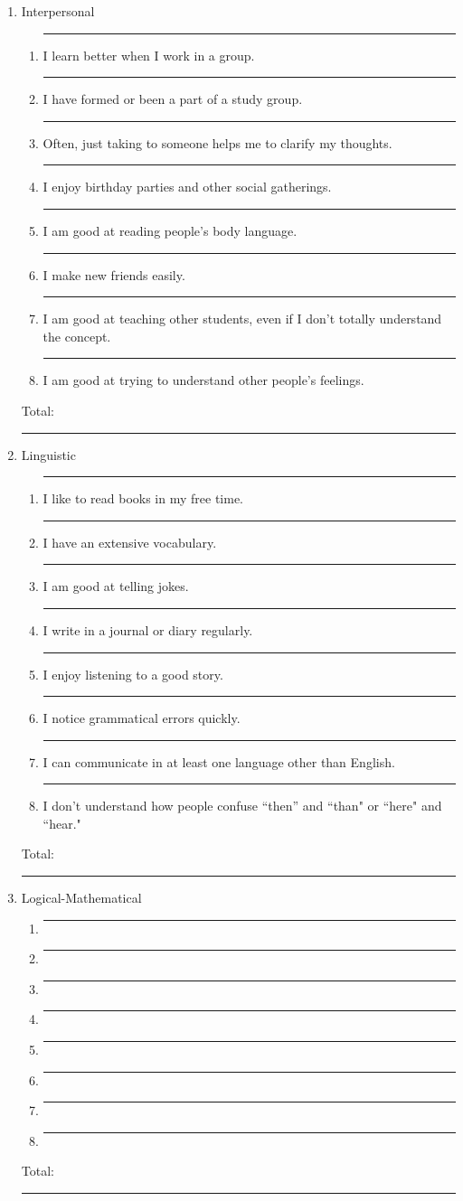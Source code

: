 \documentclass[letterpaper, 11pt]{article}
\begin{document}
\begin{enumerate}
\item Interpersonal
	\begin{enumerate}
	\item \rule{.5in}{.01in} I learn better when I work in a group.
	\item \rule{.5in}{.01in} I have formed or been a part of a study group.
	\item \rule{.5in}{.01in} Often, just taking to someone helps me to clarify my thoughts.
	\item \rule{.5in}{.01in} I enjoy birthday parties and other social gatherings.
	\item \rule{.5in}{.01in} I am good at reading people's body language.
	\item \rule{.5in}{.01in} I make new friends easily.
	\item \rule{.5in}{.01in} I am good at teaching other students, even if I don't totally understand the concept.
	\item \rule{.5in}{.01in} I am good at trying to understand other people's feelings.
\end{enumerate}
Total:  \rule{.5in}{.01in}


\item Linguistic
	\begin{enumerate}
	\item \rule{.5in}{.01in} I like to read books in my free time.
	\item \rule{.5in}{.01in} I have an extensive vocabulary.
	\item \rule{.5in}{.01in} I am good at telling jokes.
	\item \rule{.5in}{.01in} I write in a journal or diary regularly. 
	\item \rule{.5in}{.01in} I enjoy listening to a good story.
	\item \rule{.5in}{.01in} I notice grammatical errors quickly.  
	\item \rule{.5in}{.01in} I can communicate in at least one language other than English.
	\item \rule{.5in}{.01in} I don't understand how people confuse ``then'' and ``than" or ``here" and ``hear."
	
\end{enumerate}
Total:  \rule{.5in}{.01in}

\item Logical-Mathematical
	\begin{enumerate}
	\item \rule{.5in}{.01in} 
	\item \rule{.5in}{.01in} 
	\item \rule{.5in}{.01in} 
	\item \rule{.5in}{.01in} 
	\item \rule{.5in}{.01in} 
	\item \rule{.5in}{.01in} 
	\item \rule{.5in}{.01in} 
	\item \rule{.5in}{.01in} 
\end{enumerate}
Total:  \rule{.5in}{.01in}


\end{enumerate}
\end{document}
